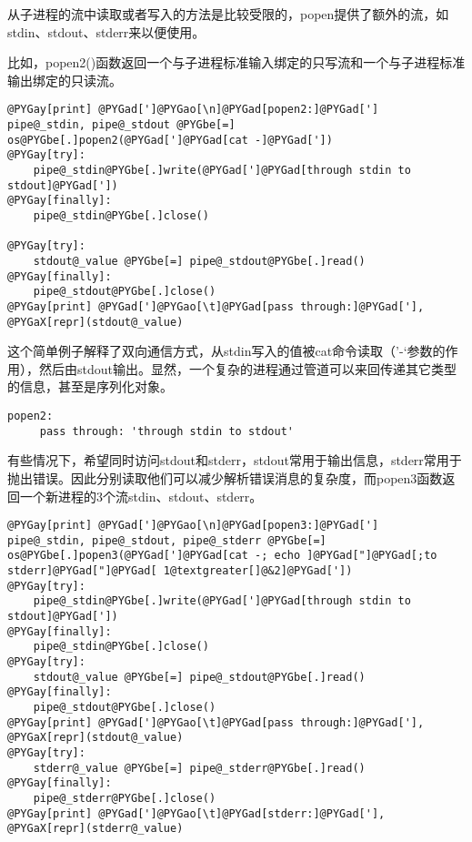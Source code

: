 \documentclass[a4paper,10pt,english]{manual}
\begin{document}
从子进程的流中读取或者写入的方法是比较受限的，popen提供了额外的流，如stdin、stdout、stderr来以便使用。

比如，popen2()函数返回一个与子进程标准输入绑定的只写流和一个与子进程标准输出绑定的只读流。

\begin{Verbatim}[commandchars=@\[\]]
@PYGay[print] @PYGad[']@PYGao[\n]@PYGad[popen2:]@PYGad[']
pipe@_stdin, pipe@_stdout @PYGbe[=] os@PYGbe[.]popen2(@PYGad[']@PYGad[cat -]@PYGad['])
@PYGay[try]:
    pipe@_stdin@PYGbe[.]write(@PYGad[']@PYGad[through stdin to stdout]@PYGad['])
@PYGay[finally]:
    pipe@_stdin@PYGbe[.]close()

@PYGay[try]:
    stdout@_value @PYGbe[=] pipe@_stdout@PYGbe[.]read()
@PYGay[finally]:
    pipe@_stdout@PYGbe[.]close()
@PYGay[print] @PYGad[']@PYGao[\t]@PYGad[pass through:]@PYGad['], @PYGaX[repr](stdout@_value)
\end{Verbatim}

这个简单例子解释了双向通信方式，从stdin写入的值被cat命令读取（'-`参数的作用），然后由stdout输出。显然，一个复杂的进程通过管道可以来回传递其它类型的信息，甚至是序列化对象。

\begin{Verbatim}[commandchars=@\[\]]
popen2:
     pass through: 'through stdin to stdout'
\end{Verbatim}

有些情况下，希望同时访问stdout和stderr，stdout常用于输出信息，stderr常用于抛出错误。因此分别读取他们可以减少解析错误消息的复杂度，而popen3函数返回一个新进程的3个流stdin、stdout、stderr。

\begin{Verbatim}[commandchars=@\[\]]
@PYGay[print] @PYGad[']@PYGao[\n]@PYGad[popen3:]@PYGad[']
pipe@_stdin, pipe@_stdout, pipe@_stderr @PYGbe[=] os@PYGbe[.]popen3(@PYGad[']@PYGad[cat -; echo ]@PYGad["]@PYGad[;to stderr]@PYGad["]@PYGad[ 1@textgreater[]@&2]@PYGad['])
@PYGay[try]:
    pipe@_stdin@PYGbe[.]write(@PYGad[']@PYGad[through stdin to stdout]@PYGad['])
@PYGay[finally]:
    pipe@_stdin@PYGbe[.]close()
@PYGay[try]:
    stdout@_value @PYGbe[=] pipe@_stdout@PYGbe[.]read()
@PYGay[finally]:
    pipe@_stdout@PYGbe[.]close()
@PYGay[print] @PYGad[']@PYGao[\t]@PYGad[pass through:]@PYGad['], @PYGaX[repr](stdout@_value)
@PYGay[try]:
    stderr@_value @PYGbe[=] pipe@_stderr@PYGbe[.]read()
@PYGay[finally]:
    pipe@_stderr@PYGbe[.]close()
@PYGay[print] @PYGad[']@PYGao[\t]@PYGad[stderr:]@PYGad['], @PYGaX[repr](stderr@_value)
\end{Verbatim}
\end{document}
